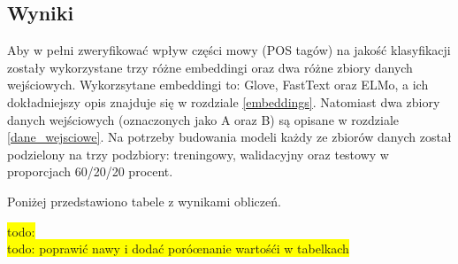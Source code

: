 

\subsection{Wyniki}


Aby w pełni zweryfikować wpływ części mowy (POS tagów) na jakość klasyfikacji zostały wykorzystane trzy różne embeddingi oraz dwa różne zbiory danych wejściowych. Wykorzsytane embeddingi to: Glove, FastText oraz ELMo, a ich dokładniejszy opis znajduje się w rozdziale \ref{embeddings}. Natomiast dwa zbiory danych wejściowych (oznaczonych jako A oraz B) są opisane w rozdziale \ref{dane_wejsciowe}. Na potrzeby budowania modeli każdy ze zbiorów danych został podzielony na trzy podzbiory: treningowy, walidacyjny oraz testowy w proporcjach 60/20/20 procent.

Poniżej przedstawiono tabele z wynikami obliczeń.

\colorbox{yellow}{todo:}\\


\colorbox{yellow}{todo: poprawić nawy i dodać poróœnanie wartośći w tabelkach}\\


